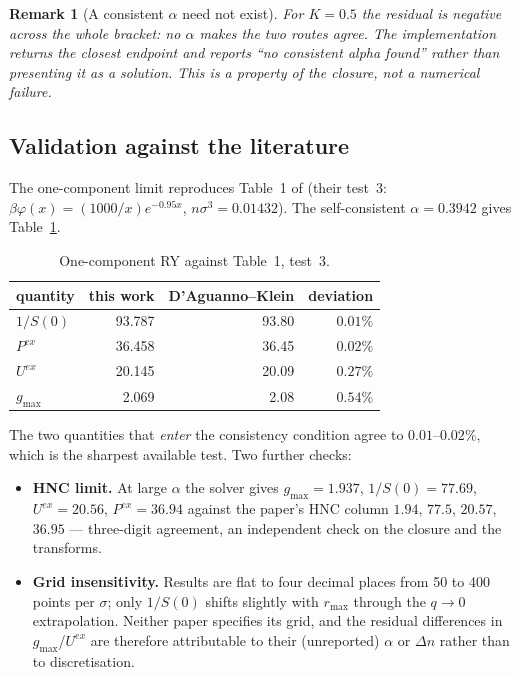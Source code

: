 \documentclass[11pt,a4paper]{article}
\newtheorem{remark}{Remark}
\begin{document}
\begin{remark}[A consistent $\alpha$ need not exist]
For $K=0.5$ the residual is negative across the whole bracket: no $\alpha$
makes the two routes agree. The implementation returns the closest endpoint
and reports ``no consistent alpha found'' rather than presenting it as a
solution. This is a property of the closure, not a numerical failure.
\end{remark}

\subsection{Validation against the literature}

The one-component limit reproduces Table~1 of \cite{daguanno1991}
(their test~3: $\beta\varphi(x)=(1000/x)e^{-0.95x}$, $n\sigma^3=0.01432$).
The self-consistent $\alpha=0.3942$ gives Table~\ref{tab:dk}.

\begin{table}[htbp]
\centering
\caption{One-component RY against \cite{daguanno1991} Table~1, test~3.}
\label{tab:dk}
\begin{tabular}{lrrr}
\toprule
quantity & this work & D'Aguanno--Klein & deviation\\
\midrule
$1/S(0)$   & 93.787 & 93.80 & $0.01\%$\\
$P^{ex}$   & 36.458 & 36.45 & $0.02\%$\\
$U^{ex}$   & 20.145 & 20.09 & $0.27\%$\\
$g_{\max}$ &  2.069 &  2.08 & $0.54\%$\\
\bottomrule
\end{tabular}
\end{table}

The two quantities that \emph{enter} the consistency condition agree to
$0.01$--$0.02\%$, which is the sharpest available test. Two further checks:
\begin{itemize}[nosep]
\item \textbf{HNC limit.} At large $\alpha$ the solver gives
      $g_{\max}=1.937$, $1/S(0)=77.69$, $U^{ex}=20.56$, $P^{ex}=36.94$
      against the paper's HNC column $1.94$, $77.5$, $20.57$, $36.95$ ---
      three-digit agreement, an independent check on the closure and the
      transforms.
\item \textbf{Grid insensitivity.} Results are flat to four decimal places
      from 50 to 400 points per $\sigma$; only $1/S(0)$ shifts slightly with
      $r_{\max}$ through the $q\to0$ extrapolation. Neither paper specifies
      its grid, and the residual differences in $g_{\max}$/$U^{ex}$ are
      therefore attributable to their (unreported) $\alpha$ or $\Delta n$
      rather than to discretisation.
\end{itemize}
\end{document}
